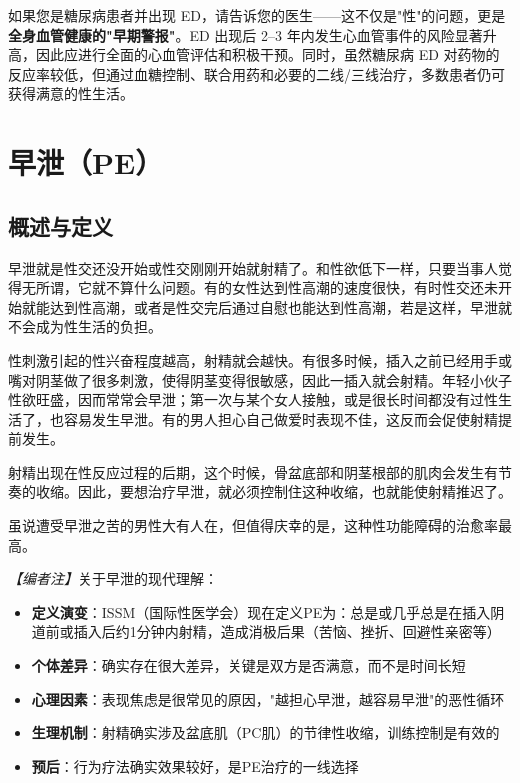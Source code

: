 \documentclass[12pt,a4paper,twoside]{ctexbook}
\begin{document}
\begin{tcolorbox}[colback=pink!5!white,colframe=red!50!black,title=贴心小叮咛]
如果您是糖尿病患者并出现 ED，请告诉您的医生——这不仅是"性"的问题，更是\textbf{全身血管健康的"早期警报"}。ED 出现后 2--3 年内发生心血管事件的风险显著升高，因此应进行全面的心血管评估和积极干预。同时，虽然糖尿病 ED 对药物的反应率较低，但通过血糖控制、联合用药和必要的二线/三线治疗，多数患者仍可获得满意的性生活。
\end{tcolorbox}

\section{早泄（PE）}

\subsection{概述与定义}

早泄就是性交还没开始或性交刚刚开始就射精了。和性欲低下一样，只要当事人觉得无所谓，它就不算什么问题。有的女性达到性高潮的速度很快，有时性交还未开始就能达到性高潮，或者是性交完后通过自慰也能达到性高潮，若是这样，早泄就不会成为性生活的负担。

性刺激引起的性兴奋程度越高，射精就会越快。有很多时候，插入之前已经用手或嘴对阴茎做了很多刺激，使得阴茎变得很敏感，因此一插入就会射精。年轻小伙子性欲旺盛，因而常常会早泄；第一次与某个女人接触，或是很长时间都没有过性生活了，也容易发生早泄。有的男人担心自己做爱时表现不佳，这反而会促使射精提前发生。

射精出现在性反应过程的后期，这个时候，骨盆底部和阴茎根部的肌肉会发生有节奏的收缩。因此，要想治疗早泄，就必须控制住这种收缩，也就能使射精推迟了。

虽说遭受早泄之苦的男性大有人在，但值得庆幸的是，这种性功能障碍的治愈率最高。

\noindent\textit{【编者注】}关于早泄的现代理解：
\begin{itemize}
	\item \textbf{定义演变}：ISSM（国际性医学会）现在定义PE为：总是或几乎总是在插入阴道前或插入后约1分钟内射精，造成消极后果（苦恼、挫折、回避性亲密等）
	\item \textbf{个体差异}：确实存在很大差异，关键是双方是否满意，而不是时间长短
	\item \textbf{心理因素}：表现焦虑是很常见的原因，"越担心早泄，越容易早泄"的恶性循环
	\item \textbf{生理机制}：射精确实涉及盆底肌（PC肌）的节律性收缩，训练控制是有效的
	\item \textbf{预后}：行为疗法确实效果较好，是PE治疗的一线选择
\end{itemize}
\end{document}
